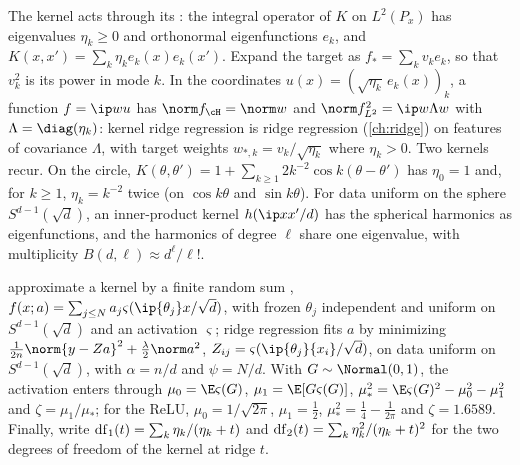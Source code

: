 \begin{refsection}
The kernel acts through its : the integral operator of $K$ on $L^2(P_x)$ has eigenvalues $\eta_k\ge0$ and orthonormal eigenfunctions $e_k$, and $K(x,x')=\sum_k\eta_ke_k(x)e_k(x')$. Expand the target as $f_*=\sum_kv_ke_k$, so that $v_k^2$ is its power in mode $k$. In the coordinates $u(x)=(\sqrt{\eta_k}\,e_k(x))_k$, a function $f=\ip w{u}$ has $\norm f_\cH=\norm w$ and $\norm f^2_{L^2}=\ip w{\Lambda w}$ with $\Lambda=\diag(\eta_k)$: kernel ridge regression is ridge regression (\cref{ch:ridge}) on features of covariance $\Lambda$, with target weights $w_{*,k}=v_k/\sqrt{\eta_k}$ where $\eta_k>0$. Two kernels recur. On the circle, $K(\theta,\theta')=1+\sum_{k\ge1}2k^{-2}\cos k(\theta-\theta')$ has $\eta_0=1$ and, for $k\ge1$, $\eta_k=k^{-2}$ twice (on $\cos k\theta$ and $\sin k\theta$). For data uniform on the sphere $S^{d-1}(\sqrt d)$, an inner-product kernel $h(\ip x{x'}/d)$ has the spherical harmonics as eigenfunctions, and the harmonics of degree $\ell$ share one eigenvalue, with multiplicity $B(d,\ell)\approx d^\ell/\ell!$.

 approximate a kernel by a finite random sum \parencite{RahimiRecht2007}, $f(x;a)=\sum_{j\le N}a_j\varsigma(\ip{\theta_j}x/\sqrt d)$, with frozen $\theta_j$ independent and uniform on $S^{d-1}(\sqrt d)$ and an activation $\varsigma$; ridge regression fits $a$ by minimizing $\frac1{2n}\norm{y-Za}^2+\frac\lambda2\norm a^2$, $Z_{ij}=\varsigma(\ip{\theta_j}{x_i}/\sqrt d)$, on data uniform on $S^{d-1}(\sqrt d)$, with $\alpha=n/d$ and $\psi=N/d$. With $G\sim\Normal(0,1)$, the activation enters through $\mu_0=\E\varsigma(G)$, $\mu_1=\E[G\varsigma(G)]$, $\mu_*^2=\E\varsigma(G)^2-\mu_0^2-\mu_1^2$ and $\zeta=\mu_1/\mu_*$; for the ReLU, $\mu_0=1/\sqrt{2\pi}$, $\mu_1=\frac12$, $\mu_*^2=\frac14-\frac1{2\pi}$ and $\zeta=1.6589$. Finally, write $\mathrm{df}_1(t)=\sum_k\eta_k/(\eta_k+t)$ and $\mathrm{df}_2(t)=\sum_k\eta_k^2/(\eta_k+t)^2$ for the two degrees of freedom of the kernel at ridge $t$.


\end{refsection}
